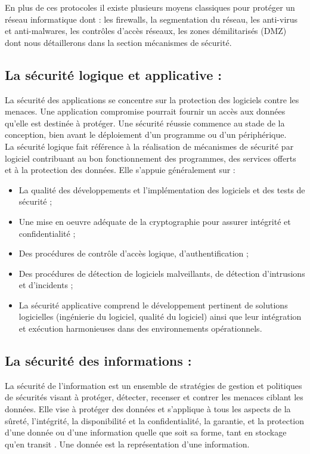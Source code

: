 En plus de ces protocoles il existe plusieurs moyens classiques pour protéger un réseau informatique dont : les firewalls, la segmentation du réseau, les anti-virus et anti-malwares, les contrôles d’accès réseaux, les zones démilitarisés (DMZ) dont nous détaillerons dans la section mécanismes de sécurité.
\subsection{La sécurité logique et applicative :}
La sécurité des applications se concentre sur la protection des logiciels contre les menaces. Une application compromise pourrait fournir un accès aux données qu'elle est destinée à protéger. Une sécurité réussie commence au stade de la conception, bien avant le déploiement d'un programme ou d'un périphérique.\\
La sécurité logique fait référence à la réalisation de mécanismes de sécurité par logiciel contribuant au bon fonctionnement des programmes, des services offerts et à la protection des données. Elle s’appuie généralement sur :
\begin{itemize}
\item La qualité des développements et l’implémentation des logiciels et des tests de sécurité ;
\item Une mise en oeuvre adéquate de la cryptographie pour assurer intégrité et confidentialité ;
\item Des procédures de contrôle d’accès logique, d’authentification ;
\item Des procédures de détection de logiciels malveillants, de détection d’intrusions et d’incidents ;
\item La sécurité applicative comprend le développement pertinent de solutions logicielles (ingénierie du logiciel, qualité du logiciel) ainsi que leur intégration et exécution harmonieuses dans des environnements opérationnels.
\end{itemize}
\subsection{La sécurité des informations : }
La sécurité de l'information est un ensemble de stratégies de gestion et politiques de sécurités visant à protéger, détecter, recenser et contrer les menaces ciblant les données.  Elle vise à protéger des données et s'applique à tous les aspects de la sûreté, l'intégrité, la disponibilité et la confidentialité, la garantie, et la protection d'une donnée ou d'une information quelle que soit sa forme, tant en stockage qu'en transit \cite{ref8}. Une donnée est la représentation d’une information.

